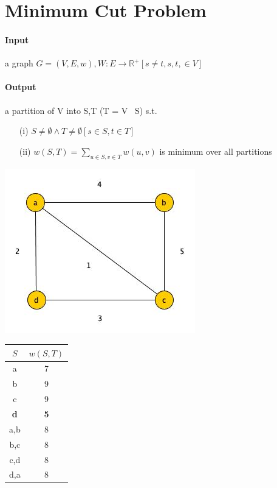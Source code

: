 \section{Minimum Cut Problem }
\paragraph{Input} a graph $G=(V,E,w), W: E \rightarrow \mathbb{R}^+[s\neq t, s,t, \in V]$

\paragraph{Output} a partition of V into S,T (T = V \ S) s.t.

\begin{itemize}
	\item[(i)] $S \neq \emptyset \land T \neq \emptyset [s \in S, t \in T]$
	\item[(ii)] $w(S,T) = \sum_{u\in S, v\in T}w(u,v)$ is minimum over all partitions
\end{itemize}
\begin{center}
\includegraphics[scale=0.75]{img/graph7} \\
\end{center}
\begin{tabular}{|c|c|} \hline 
	$S$ & $w(S,T)$ \\ \hline 
	a & 7 \\
	b & 9 \\
	c & 9 \\
	\textbf{d} & \textbf{5} \\
	a,b & 8 \\
	b,c &  8 \\
	c,d &  8 \\
	d,a &  8 \\ \hline
\end{tabular} \\

